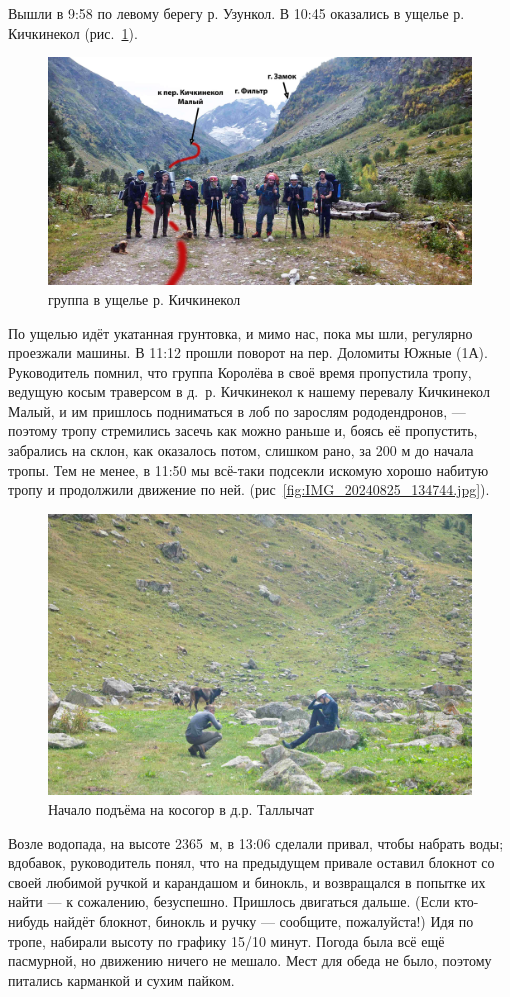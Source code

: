 Вышли в 9:58 по левому берегу р. Узункол. В 10:45 оказались в ущелье р. Кичкинекол (рис.~\ref{fig:DSC_0127.JPG}). 

\begin{figure}[h!]
	\centering
	\includegraphics[width=0.7\linewidth]{../pics/DSC_0127.jpg}
	\caption{группа в ущелье р. Кичкинекол}
	\label{fig:DSC_0127.JPG}
\end{figure}


По ущелью идёт укатанная грунтовка, и мимо нас, пока мы шли, регулярно проезжали машины. В 11:12 прошли поворот на пер. Доломиты Южные (1А). Руководитель помнил, что группа Королёва \cite{Korolyov2018} в своё время пропустила тропу, ведущую косым траверсом в д.~р. Кичкинекол к нашему перевалу Кичкинекол Малый, и им пришлось подниматься в лоб по зарослям рододендронов, --- поэтому тропу стремились засечь как можно раньше и, боясь её пропустить, забрались на склон, как оказалось потом, слишком рано, за 200 м до начала тропы. Тем не менее, в 11:50 мы всё-таки подсекли искомую хорошо набитую тропу и продолжили движение по ней. (рис~\ref{fig:IMG_20240825_134744.jpg}).  
	
	\begin{figure}[h!]
		\centering
		\includegraphics[width=0.7\linewidth]{../pics/DSC_0138.jpg}
		\caption{Начало подъёма на косогор в д.р. Таллычат}
		\label{fig:DSC_0138.JPG}
	\end{figure}
	
Возле водопада, на высоте 2365~м, в 13:06 сделали привал, чтобы набрать воды; вдобавок, руководитель понял, что на предыдущем привале оставил блокнот со своей любимой ручкой и карандашом и бинокль, и возвращался в попытке их найти --- к сожалению, безуспешно. Пришлось двигаться дальше. (Если кто-нибудь найдёт блокнот, бинокль и ручку --- сообщите, пожалуйста!) Идя по тропе, набирали высоту по графику 15/10 минут. Погода была всё ещё пасмурной, но движению ничего не мешало. Мест для обеда не было, поэтому питались карманкой и сухим пайком.

